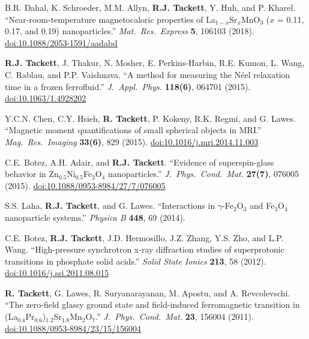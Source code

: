 \documentclass[10pt]{article}
\begin{document}
\begin{reflist}
\item B.R. Dahal, K. Schroeder, M.M. Allyn, \textbf{R.J. Tackett}, Y. Huh, and P. Kharel. ``Near-room-temperature magnetocaloric properties of La$_{1-x}$Sr$_x$MnO$_3$ ($x$ = 0.11, 0.17, and 0.19) nanoparticles.'' \textit{Mat.\ Res.\ Express} \textbf{5}, 106103 (2018). \href{https://doi.org/10.1088/2053-1591/aadabd}{\small\allowbreak doi:10.1088/2053-1591/aadabd}
\item \textbf{R.J. Tackett}, J. Thakur, N. Mosher, E. Perkins-Harbin, R.E. Kumon, L. Wang, C. Rablau, and P.P. Vaishnava. ``A method for measuring the N\'eel relaxation time in a frozen ferrofluid.'' \textit{J.\ Appl.\ Phys.} \textbf{118(6)}, 064701 (2015). \href{https://doi.org/10.1063/1.4928202}{\small\allowbreak doi:10.1063/1.4928202}
\item Y.C.N. Chen, C.Y. Hsieh, \textbf{R. Tackett}, P. Kokeny, R.K. Regmi, and G. Lawes. ``Magnetic moment quantifications of small spherical objects in MRI.'' \textit{Mag.\ Res.\ Imaging} \textbf{33(6)}, 829 (2015). \href{https://doi.org/10.1016/j.mri.2014.11.003}{\small\allowbreak doi:10.1016/j.mri.2014.11.003}
\item C.E. Botez, A.H. Adair, and \textbf{R.J. Tackett}. ``Evidence of superspin-glass behavior in Zn$_{0.5}$Ni$_{0.5}$Fe$_2$O$_4$ nanoparticles.'' \textit{J.\ Phys.\ Cond.\ Mat.} \textbf{27(7)}, 076005 (2015). \href{https://doi.org/10.1088/0953-8984/27/7/076005}{\small\allowbreak doi:10.1088/0953-8984/27/7/076005}
\item S.S. Laha, \textbf{R.J. Tackett}, and G. Lawes. ``Interactions in $\gamma$-Fe$_2$O$_3$ and Fe$_3$O$_4$ nanoparticle systems.'' \textit{Physica B} \textbf{448}, 69 (2014).
\item C.E. Botez, \textbf{R.J. Tackett}, J.D. Hermosillo, J.Z. Zhang, Y.S. Zho, and L.P. Wang. ``High-pressure synchrotron x-ray diffraction studies of superprotonic transitions in phosphate solid acids.'' \textit{Solid State Ionics} \textbf{213}, 58 (2012). \href{https://doi.org/10.1016/j.ssi.2011.08.015}{\small\allowbreak doi:10.1016/j.ssi.2011.08.015}
\item \textbf{R. Tackett}, G. Lawes, R. Suryanarayanan, M. Apostu, and A. Revcolevschi. ``The zero-field glassy ground state and field-induced ferromagnetic transition in (La$_{0.4}$Pr$_{0.6}$)$_{1.2}$Sr$_{1.8}$Mn$_2$O$_7$.'' \textit{J.\ Phys.\ Cond.\ Mat.} \textbf{23}, 156004 (2011). \href{https://doi.org/10.1088/0953-8984/23/15/156004}{\small\allowbreak doi:10.1088/0953-8984/23/15/156004}

\end{reflist}
\end{document}
